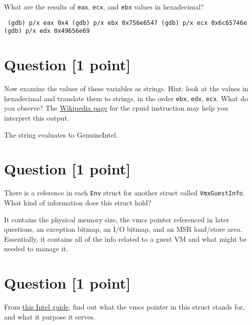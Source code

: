 \documentclass[11pt]{article}
\begin{document}
What are the results of \texttt{eax}, \texttt{ecx}, and \texttt{ebx} values in hexadecimal?

\begin{solution}
    \texttt{\newline
    (gdb) p/x eax
    0x4 \newline
    (gdb) p/x ebx
     0x756e6547 \newline
    (gdb) p/x ecx
    0x6c65746e\newline
    (gdb) p/x edx
    0x49656e69\newline
    }
\end{solution}


\section{Question [1 point]}

Now examine the values of these variables as strings. 
Hint: look at the values in hexadecimal and translate them to strings, 
in the order \texttt{ebx}, \texttt{edx}, \texttt{ecx}. What do you observe? 
The \href{https://en.wikipedia.org/wiki/CPUID}{Wikipedia page} for the cpuid instruction 
may help you interpret this output.

\begin{solution}
The string evaluates to GenuineIntel.
\end{solution}


\section{Question [1 point]}

There is a reference in each \texttt{Env} struct for another struct called 
\texttt{VmxGuestInfo}. What kind of information does this struct hold?

\begin{solution}
It contains the physical memory size, the vmcs pointer referenced in later questions, an exception bitmap, an 
I/O bitmap, and an MSR load/store area. Essentially, it contains all of the info related to a guest VM  
and what might be needed to manage it. 
\end{solution}


\section{Question [1 point]}

From \href{https://www.cs.utexas.edu/~vijay/cs378-f17/projects/64-ia-32-architectures-software-developer-vol-3c-part-3-manual.pdf}{this Intel guide}, 
find out what the vmcs pointer in this struct stands for, and what it purpose it serves.
\end{document}

